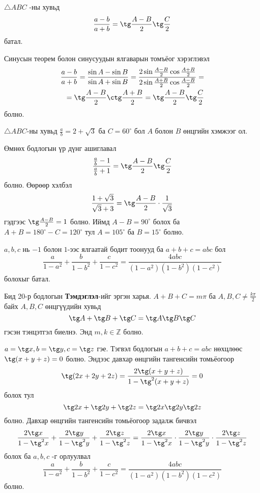 \documentclass[10pt,a4paper,oneside]{book}
\begin{document}
\Problem
$\triangle ABC$ -ны хувьд
\begin{equation*}
\frac{a-b}{a+b} = \tg\frac{A-B}{2}\tg\frac{C}{2}
\end{equation*}
батал.

\TheSolution
Синусын теорем болон синусуудын ялгаварын томъёог хэрэглэвэл
\begin{align*}
\frac{a-b}{a+b} = \frac{\sin A - \sin B}{\sin A + \sin B} = \frac{2\sin\frac{A-B}{2}\cos\frac{A+B}{2}}{2\sin\frac{A+B}{2}\cos\frac{A-B}{2}} = \\
= \tg\frac{A-B}{2}\ctg\frac{A+B}{2} = \tg\frac{A-B}{2}\tg\frac{C}{2}
\end{align*}
болно.

\Problem
$\triangle ABC$-ны хувьд $\frac{a}{b} = 2+\sqrt{3}$ ба $C = 60^\circ$ бол $A$ болон $B$ өнцгийн хэмжээг ол.

\TheSolution
Өмнөх бодлогын үр дүнг ашиглавал
\begin{equation*}
\frac{\frac{a}{b} - 1}{\frac{a}{b} + 1} = \tg \frac{A-B}{2}\tg\frac{C}{2}
\end{equation*}
болно. Өөрөөр хэлбэл
\begin{equation*}
\frac{1+\sqrt{3}}{\sqrt{3}+3} = \tg\frac{A-B}{2}\cdot \frac{1}{\sqrt{3}}
\end{equation*}
гэдгээс $\tg\frac{A-B}{2} = 1$ болно. Иймд $A-B = 90^\circ$ болох ба $A+B = 180^\circ - C = 120^\circ$ тул $A=105^\circ$ ба $B=15^\circ$ болно.

\Problem
$a, b, c$ нь $-1$ болон $1$-ээс ялгаатай бодит тоонууд ба $a+b+c = abc$ бол
\begin{equation*}
\frac{a}{1-a^2} + \frac{b}{1-b^2} + \frac{c}{1-c^2} = \frac{4abc}{(1-a^2)(1-b^2)(1-c^2)}
\end{equation*}
болохыг батал.

\TheSolution
Бид 20-р бодлогын \textbf{Тэмдэглэл}-ийг эргэн харья. $A+B+C = m\pi$ ба $A, B, C \neq \frac{k\pi}{2}$ байх $A, B, C$ өнцгүүдийн хувьд
\begin{equation*}
\tg A + \tg B + \tg C  = \tg A \tg B \tg C
\end{equation*}
гэсэн тэнцэтгэл биелнэ. Энд $m, k \in \mathbb{Z}$ болно.

$a=\tg x, b = \tg y, c=\tg z$ гэе. Тэгвэл бодлогын $a+b+c = abc$ нөхцлөөс $\tg(x+y+z) = 0$ болно. Эндээс давхар өнцгийн тангенсийн томьёогоор
\begin{equation*}
\tg (2x+2y+2z) = \frac{2\tg (x+y+z)}{1-\tg^2 (x+y+z)} = 0
\end{equation*}
болох тул
\begin{equation*}
\tg 2x + \tg 2y + \tg 2z = \tg 2x\tg 2y\tg 2z
\end{equation*}
болно. Давхар өнцгийн тангенсийн томьёогоор задалж бичвэл
\begin{equation*}
\frac{2\tg x}{1-\tg^2 x} + \frac{2\tg y}{1-\tg^2 y} + \frac{2\tg z}{1-\tg^2 z} = \frac{2\tg x}{1-\tg^2 x}\cdot           \frac{2\tg y}{1-\tg^2 y}\cdot \frac{2\tg z}{1-\tg^2 z}
\end{equation*}
болох ба $a, b, c$ -г орлуулвал
\begin{equation*}
\frac{a}{1-a^2} + \frac{b}{1-b^2} + \frac{c}{1-c^2} = \frac{4abc}{(1-a^2)(1-b^2)(1-c^2)}
\end{equation*}
болно.
\end{document}
